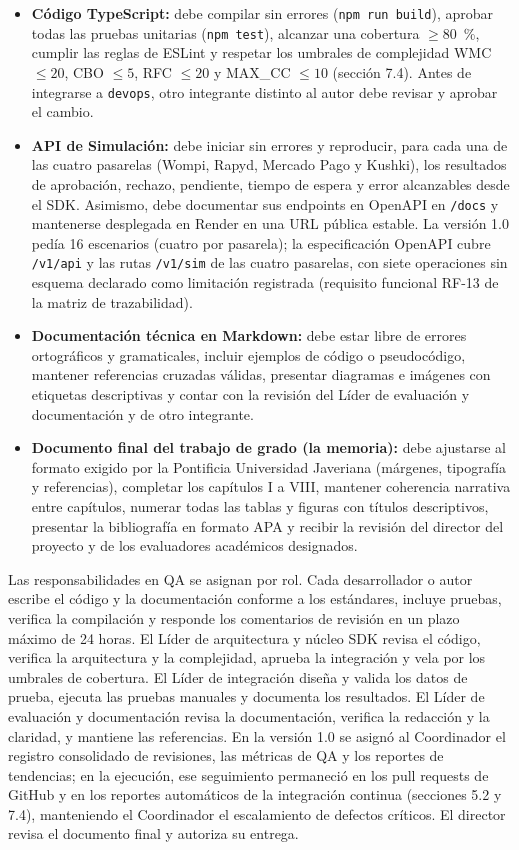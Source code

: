 \begin{itemize}
  \item \textbf{Código TypeScript:} debe compilar sin errores (\texttt{npm run build}), aprobar todas las pruebas unitarias (\texttt{npm test}), alcanzar una cobertura $\ge 80$~\%, cumplir las reglas de ESLint y respetar los umbrales de complejidad WMC $\le 20$, CBO $\le 5$, RFC $\le 20$ y MAX\_CC $\le 10$ (sección 7.4). Antes de integrarse a \texttt{devops}, otro integrante distinto al autor debe revisar y aprobar el cambio.
  \item \textbf{API de Simulación:} debe iniciar sin errores y reproducir, para cada una de las cuatro pasarelas (Wompi, Rapyd, Mercado Pago y Kushki), los resultados de aprobación, rechazo, pendiente, tiempo de espera y error alcanzables desde el SDK. Asimismo, debe documentar sus endpoints en OpenAPI en \texttt{/docs} y mantenerse desplegada en Render en una URL pública estable. La versión 1.0 pedía 16 escenarios (cuatro por pasarela); la especificación OpenAPI cubre \texttt{/v1/api} y las rutas \texttt{/v1/sim} de las cuatro pasarelas, con siete operaciones sin esquema declarado como limitación registrada (requisito funcional RF-13 de la matriz de trazabilidad).
  \item \textbf{Documentación técnica en Markdown:} debe estar libre de errores ortográficos y gramaticales, incluir ejemplos de código o pseudocódigo, mantener referencias cruzadas válidas, presentar diagramas e imágenes con etiquetas descriptivas y contar con la revisión del Líder de evaluación y documentación y de otro integrante.
  \item \textbf{Documento final del trabajo de grado (la memoria):} debe ajustarse al formato exigido por la Pontificia Universidad Javeriana (márgenes, tipografía y referencias), completar los capítulos I a VIII, mantener coherencia narrativa entre capítulos, numerar todas las tablas y figuras con títulos descriptivos, presentar la bibliografía en formato APA y recibir la revisión del director del proyecto y de los evaluadores académicos designados.
\end{itemize}

Las responsabilidades en QA se asignan por rol. Cada desarrollador o autor escribe el código y la documentación conforme a los estándares, incluye pruebas, verifica la compilación y responde los comentarios de revisión en un plazo máximo de 24 horas. El Líder de arquitectura y núcleo SDK revisa el código, verifica la arquitectura y la complejidad, aprueba la integración y vela por los umbrales de cobertura. El Líder de integración diseña y valida los datos de prueba, ejecuta las pruebas manuales y documenta los resultados. El Líder de evaluación y documentación revisa la documentación, verifica la redacción y la claridad, y mantiene las referencias. En la versión 1.0 se asignó al Coordinador el registro consolidado de revisiones, las métricas de QA y los reportes de tendencias; en la ejecución, ese seguimiento permaneció en los pull requests de GitHub y en los reportes automáticos de la integración continua (secciones 5.2 y 7.4), manteniendo el Coordinador el escalamiento de defectos críticos. El director revisa el documento final y autoriza su entrega.

